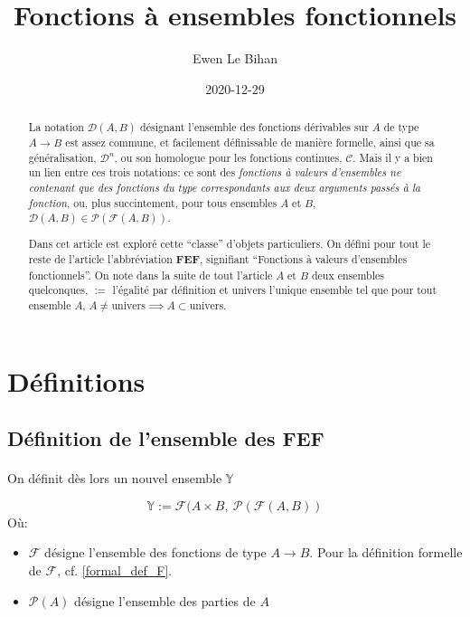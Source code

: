 \documentclass{article}
\author{Ewen Le Bihan}
\date{2020-12-29}
\title{Fonctions à ensembles fonctionnels}
\newcommand{\Y}{{\mathbb Y}}
\newcommand{\cC}{{\mathcal C}}
\newcommand{\cD}{{\mathcal D}}
\newcommand{\cF}{{\mathcal F}}
\begin{document}
\maketitle
\begin{abstract}
	La notation $\cD(A, B)$ désignant l'ensemble des fonctions dérivables sur $A$ de type $A\to B$ est assez commune, et facilement définissable de manière formelle, ainsi que sa généralisation, $\cD^n$, ou son homologue pour les fonctions continues, $\cC$. Mais il y a bien un lien entre ces trois notations: ce sont des \emph{fonctions à valeurs d'ensembles ne contenant que des fonctions du type correspondants aux deux arguments passés à la fonction}, ou, plus succintement, pour tous ensembles $A$ et $B$, $\cD(A, B) \in \mathcal P(\cF(A, B))$.
	

	Dans cet article est exploré cette “classe” d'objets particuliers. On défini pour tout le reste de l'article l'abbréviation {\bf FEF}, signifiant “Fonctions à valeurs d'ensembles fonctionnels”. On note dans la suite de tout l'article $A$ et $B$ deux ensembles quelconques, $:=$ l'égalité par définition et $\text{univers}$ l'unique ensemble tel que pour tout ensemble $A$, $A \neq \text{univers} \implies A \subset \text{univers}$.
\end{abstract}

\section{Définitions}

\subsection{Définition de l'ensemble des FEF}
\paragraph{}

On définit dès lors un nouvel ensemble $\Y$%

\[
	\Y := \cF(A \times B,\ \mathcal P(\cF(A, B))
\] 
Où:

\begin{itemize}
	\item $\cF$ désigne l'ensemble des fonctions de type $A\to B$. Pour la définition formelle de $\cF$, cf. \ref{formal_def_F}.
	\item $\mathcal P(A)$ désigne l'ensemble des parties de $A$
\end{itemize}
\end{document}
